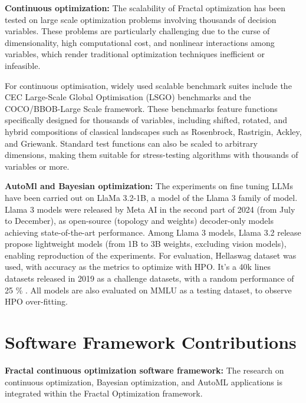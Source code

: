 {\bf Continuous optimization:} The scalability of Fractal optimization has been tested on large scale optimization problems involving thousands of decision variables. These problems are particularly challenging due to the curse of dimensionality, high computational cost, and nonlinear interactions among variables, which render traditional optimization techniques inefficient or infeasible.

For continuous optimisation, widely used scalable benchmark suites include the CEC Large-Scale Global Optimisation (LSGO) benchmarks and the COCO/BBOB-Large Scale framework. These benchmarks feature functions specifically designed for thousands of variables, including shifted, rotated, and hybrid compositions of classical landscapes such as Rosenbrock, Rastrigin, Ackley, and Griewank. Standard test functions can also be scaled to arbitrary dimensions, making them suitable for stress-testing algorithms with thousands of variables or more.

\medskip

{\bf AutoMl and Bayesian optimization:} The experiments on fine tuning LLMs have been carried out on LlaMa 3.2-1B, a model of the Llama 3 family of model. Llama 3 models were released by Meta AI in the second part of 2024 (from July to December), as open-source (topology and weights) decoder-only models achieving state-of-the-art performance. Among Llama 3 models, Llama 3.2 release propose lightweight models (from 1B to 3B weights, excluding vision models), enabling reproduction of the experiments. For evaluation, Hellaswag dataset was used, with accuracy as the metrics to optimize with HPO. It's a 40k lines datasets released in 2019 as a challenge datasets, with a random performance of 25 \% . All models are also evaluated on MMLU as a testing dataset, to observe HPO over-fitting. 

%   

\section{Software Framework Contributions}
{\bf Fractal continuous optimization software framework:} The research on continuous optimization, Bayesian optimization, and AutoML applications is integrated within the Fractal Optimization framework.

\medskip

